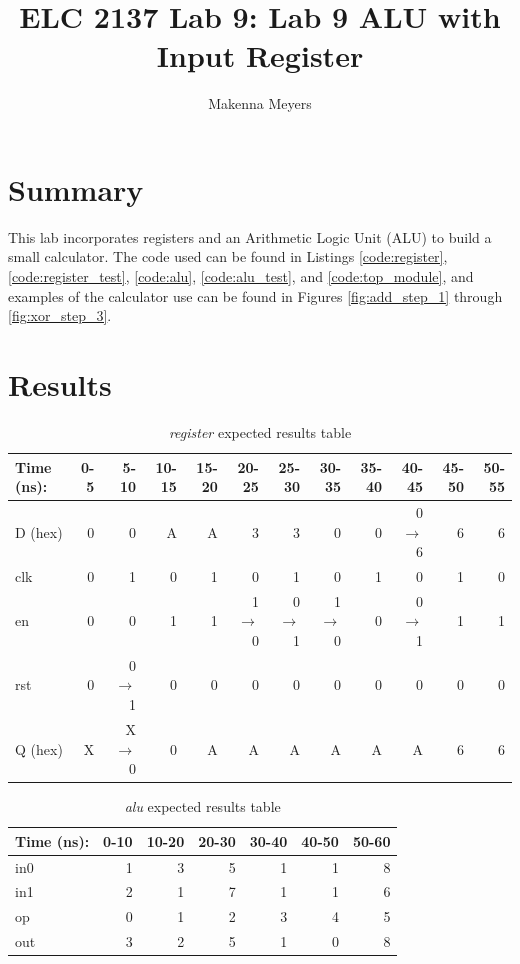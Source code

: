 \documentclass[11pt]{article}
\begin{document}
\title{ELC 2137 Lab 9: Lab 9 ALU with Input Register}
\author{Makenna Meyers}

\maketitle


\section*{Summary}
 This lab incorporates registers and an Arithmetic Logic Unit (ALU) to build a small calculator. The code used can be found in Listings \ref{code:register}, \ref{code:register_test}, \ref{code:alu}, \ref{code:alu_test}, and \ref{code:top_module}, and examples of the calculator use can be found in Figures \ref{fig:add_step_1} through \ref{fig:xor_step_3}.


\section*{Results}

\begin{table}[ht]\centering
	\caption{\textit{register} expected results table}
	\label{ALU:tbl:register_ERT}\medskip
	\begin{tabular}{l|rrrrrrrrrrr}
		Time (ns): & 0-5 & 5-10 & 10-15 & 15-20 & 20-25 & 25-30 & 30-35 & 35-40 & 40-45 & 45-50 & 50-55 \\
		\midrule
		D (hex) & 0 & 0 	  & A & A & 3 	    & 3 	  & 0 	    & 0 & 0$\to$6 & 6 & 6 \\
		clk     & 0 & 1 	  & 0 & 1 & 0 	    & 1 	  & 0 	    & 1 & 0 	  & 1 & 0 \\
		en  	& 0 & 0 	  & 1 & 1 & 1$\to$0 & 0$\to$1 & 1$\to$0 & 0 & 0$\to$1 & 1 & 1 \\
		rst 	& 0 & 0$\to$1 & 0 & 0 & 0 		& 0 	  & 0		& 0 & 0		  & 0 & 0 \\
		\midrule
		Q (hex) & X & X$\to$0 & 0 & A & A & A & A & A & A & 6 & 6 \\
		\bottomrule
	\end{tabular}
\end{table}

\begin{table}[ht]\centering
	\caption{\textit{alu} expected results table}
	\label{ALU:tbl:alu_ERT}\medskip
	\begin{tabular}{l|rrrrrr}
		Time (ns): & 0-10 & 10-20 & 20-30 & 30-40 & 40-50 & 50-60 \\
		\midrule
		in0 & 1 & 3 & 5 & 1 & 1 & 8 \\
		in1 & 2 & 1 & 7 & 1 & 1 & 6 \\
		op	& 0 & 1 & 2 & 3 & 4 & 5 \\
		\midrule
		out & 3 & 2 & 5 & 1 & 0 & 8 \\
		\bottomrule
	\end{tabular}
\end{table}
\end{document}
